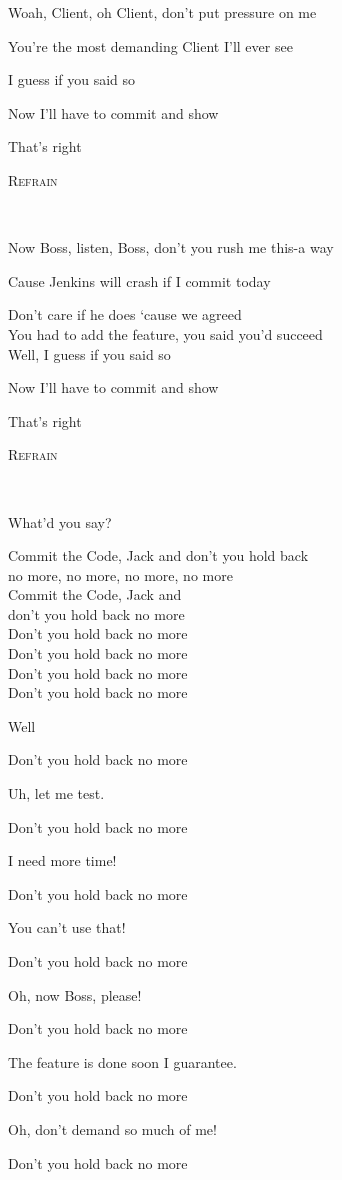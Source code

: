 \documentclass[11pt,a5paper]{article}
\newcommand\refrain[1]{\begin{tcolorbox}#1\end{tcolorbox} \ }
\newcommand{\refrefrain}{\refrain{\textsc{Refrain}} \ }
\begin{document}
\hfill Woah, Client, oh Client, don’t put pressure on me

\hfill You’re the most demanding Client I’ll ever see

\hfill I guess if you said so

\hfill Now I’ll have to commit and show 

That’s right \\

\refrefrain

\hfill Now Boss, listen, Boss, don’t you rush me this-a way

\hfill Cause Jenkins will crash if I commit today

Don’t care if he does ‘cause we agreed \\
You had to add the feature, you said you’d succeed \\

\hfill Well, I guess if you said so

\hfill Now I’ll have to commit and show 

That’s right \\

\refrefrain

\hfill What'd you say?

\refrain{
	Commit the Code, Jack and don’t you hold back \\
	no more, no more, no more, no more \\
	Commit the Code, Jack and \\ don’t you hold back no more \\
	Don’t you hold back no more \\
	Don’t you hold back no more \\
	Don’t you hold back no more \\
	Don’t you hold back no more
	
	\hfill Well
	
	Don’t you hold back no more
	
	\hfill Uh, let me test.
	
	Don’t you hold back no more
	
	\hfill I need more time!
	
	Don’t you hold back no more
	
	\hfill You can’t use that!
	
	Don’t you hold back no more
	
	\hfill Oh, now Boss, please!
	
	Don’t you hold back no more
	
	\hfill The feature is done soon I guarantee.
	
	Don’t you hold back no more
	
	\hfill Oh, don’t demand so much of me!
	
	Don’t you hold back no more}
\end{document}
